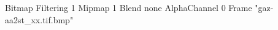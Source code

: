 {Bitmap
	{Filtering 1}
	{Mipmap 1}
	{Blend none}
	{AlphaChannel 0}
	{Frame "gaz-aa2st_xx.tif.bmp"}
}
